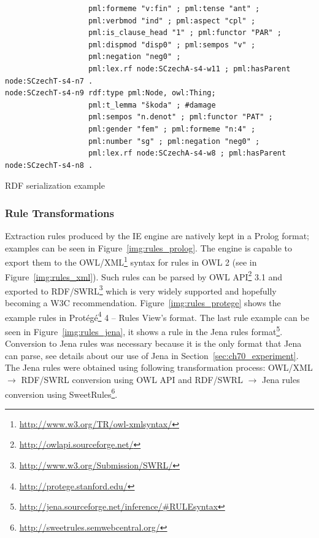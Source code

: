 \begin{listing}[ht]
\begin{verbatim}
                   pml:formeme "v:fin" ; pml:tense "ant" ;
                   pml:verbmod "ind" ; pml:aspect "cpl" ;
                   pml:is_clause_head "1" ; pml:functor "PAR" ;
                   pml:dispmod "disp0" ; pml:sempos "v" ;
                   pml:negation "neg0" ;
                   pml:lex.rf node:SCzechA-s4-w11 ; pml:hasParent node:SCzechT-s4-n7 .
node:SCzechT-s4-n9 rdf:type pml:Node, owl:Thing;
                   pml:t_lemma "škoda" ; #damage
                   pml:sempos "n.denot" ; pml:functor "PAT" ;
                   pml:gender "fem" ; pml:formeme "n:4" ;
                   pml:number "sg" ; pml:negation "neg0" ;
                   pml:lex.rf node:SCzechA-s4-w8 ; pml:hasParent node:SCzechT-s4-n8 .
\end{verbatim}
\caption{RDF serialization example}
\label{lst:rdf_serialization}
\end{listing}






\subsubsection{Rule Transformations}

Extraction rules produced by the IE engine are natively kept in a Prolog format; examples can be seen in Figure~\ref{img:rules_prolog}. The engine is capable to export them to the OWL/XML\footnote{\url{http://www.w3.org/TR/owl-xmlsyntax/}} syntax for rules in OWL 2 \citep{GHPP09a} (see in Figure~\ref{img:rules_xml}). Such rules can be parsed by OWL API\footnote{\url{http://owlapi.sourceforge.net/}} 3.1
and exported to RDF/SWRL\footnote{\url{http://www.w3.org/Submission/SWRL/}} which is very widely supported and hopefully becoming a W3C recommendation.
Figure~\ref{img:rules_protege} shows the example rules in Prot\'{e}g\'{e}\footnote{\url{http://protege.stanford.edu/}} 4 -- Rules View's format. The last rule example can be seen in Figure~\ref{img:rules_jena}, it shows a rule in the Jena rules format\footnote{\url{http://jena.sourceforge.net/inference/#RULEsyntax}}. Conversion to Jena rules was necessary because it is the only format that Jena can parse, see details about our use of Jena in Section~\ref{sec:ch70_experiment}. The Jena rules were obtained using following transformation process: OWL/XML $\rightarrow$ RDF/SWRL conversion using OWL API and RDF/SWRL $\rightarrow$ Jena rules conversion using SweetRules\footnote{\url{http://sweetrules.semwebcentral.org/}}.

